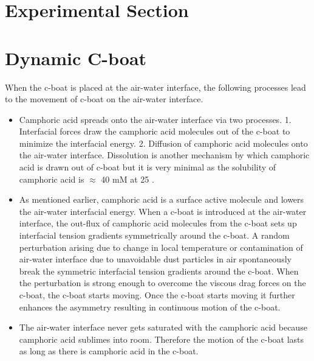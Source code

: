 \documentclass[aps, twocolumn, floatfix, superscriptaddress]{revtex4}
\begin{document}
\section{Experimental Section}
\section{Dynamic C-boat}
When the c-boat is placed at the air-water interface, the following processes lead to the movement of c-boat on the air-water interface.
\begin{itemize}
\item Camphoric acid spreads onto the air-water interface via two processes. 1. Interfacial forces draw the camphoric acid molecules out of the c-boat to minimize the interfacial energy. 2. Diffusion of camphoric acid molecules onto the air-water interface. Dissolution is another mechanism by which camphoric acid is drawn out of c-boat but it is very minimal as the solubility of camphoric acid is $\approx$ 40 mM at 25 \celsius.
\item As mentioned earlier, camphoric acid is a surface active molecule and lowers the air-water interfacial energy. When a c-boat is introduced at the air-water interface, the out-flux of camphoric acid molecules from the c-boat sets up interfacial tension gradients symmetrically around the c-boat. A random perturbation arising due to change in local temperature or contamination of air-water interface due to unavoidable dust particles in air spontaneously break the symmetric interfacial tension gradients around the c-boat. When the perturbation is strong enough to overcome the viscous drag forces on the c-boat, the c-boat starts moving. Once the c-boat starts moving it further enhances the asymmetry resulting in continuous motion of the c-boat.
\item The air-water interface never gets saturated with the camphoric acid because camphoric acid sublimes into room. Therefore the motion of the c-boat lasts as long as there is camphoric acid in the c-boat.
\end{itemize}
\end{document}
